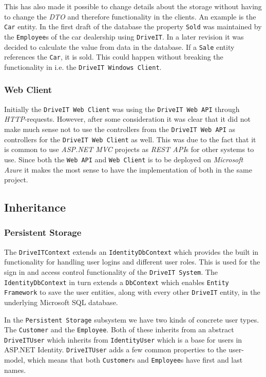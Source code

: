 This has also made it possible to change details about the storage without having to change the \textit{DTO} and therefore functionality in the clients. An example is the \texttt{Car} entity. In the first draft of the database the property \texttt{Sold} was maintained by the \texttt{Employee}s of the car dealership using \texttt{DriveIT}. In a later revision it was decided to calculate the value from data in the database. If a \texttt{Sale} entity references the \texttt{Car}, it is sold. This could happen without breaking the functionality in i.e. the \texttt{DriveIT Windows Client}.

\subsubsection{Web Client}
Initially the \texttt{DriveIT Web Client} was using the \texttt{DriveIT Web API} through \textit{HTTP}-requests. However, after some consideration it was clear that it did not make much sense not to use the controllers from the \texttt{DriveIT Web API} as controllers for the \texttt{DriveIT Web Client} as well. This was due to the fact that it is common to use \textit{ASP.NET MVC} projects as \textit{REST API}s for other systems to use. Since both the \texttt{Web API} and \texttt{Web Client} is to be deployed on \textit{Microsoft Azure} it makes the most sense to have the implementation of both in the same project.

\subsection{Inheritance}
\subsubsection{Persistent Storage}
The \texttt{DriveITContext} extends an \texttt{IdentityDbContext} which provides the built in functionality for handling user logins and different user roles. This is used for the sign in and access control functionality of the \texttt{DriveIT System}.
The \texttt{IdentityDbContext} in turn extends a \texttt{DbContext} which enables \texttt{Entity Framework} to save the user entities, along with every other \texttt{DriveIT} entity, in the underlying Microsoft SQL database.

In the \texttt{Persistent Storage} subsystem we have two kinds of concrete user types. The \texttt{Customer} and the \texttt{Employee}. Both of these inherits from an abstract \texttt{DriveITUser} which inherits from \texttt{IdentityUser} which is a base for users in ASP.NET Identity. \texttt{DriveITUser} adds a few common properties to the user-model, which means that both \texttt{Customer}s and \texttt{Employee}s have first and last names.
